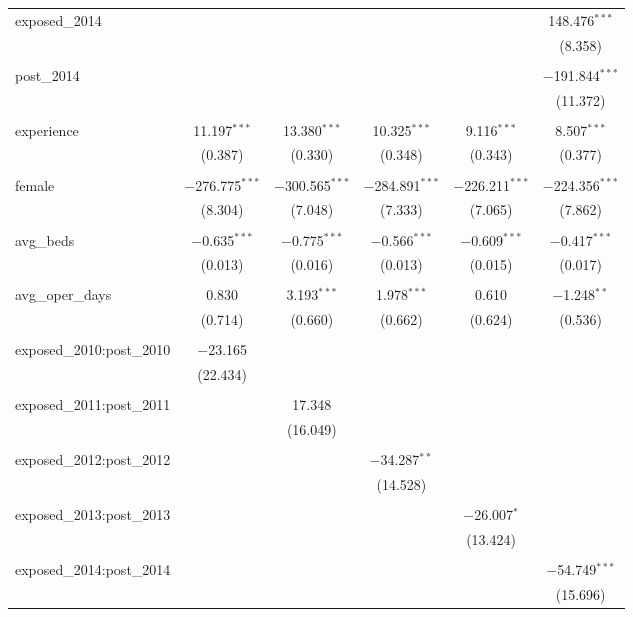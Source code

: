 \begin{table}[!htbp]
\begin{tabular}{@{\extracolsep{5pt}}lccccc}
 exposed\_2014 &  &  &  &  & 148.476$^{***}$ \\ 
  &  &  &  &  & (8.358) \\ 
  & & & & & \\ 
 post\_2014 &  &  &  &  & $-$191.844$^{***}$ \\ 
  &  &  &  &  & (11.372) \\ 
  & & & & & \\ 
 experience & 11.197$^{***}$ & 13.380$^{***}$ & 10.325$^{***}$ & 9.116$^{***}$ & 8.507$^{***}$ \\ 
  & (0.387) & (0.330) & (0.348) & (0.343) & (0.377) \\ 
  & & & & & \\ 
 female & $-$276.775$^{***}$ & $-$300.565$^{***}$ & $-$284.891$^{***}$ & $-$226.211$^{***}$ & $-$224.356$^{***}$ \\ 
  & (8.304) & (7.048) & (7.333) & (7.065) & (7.862) \\ 
  & & & & & \\ 
 avg\_beds & $-$0.635$^{***}$ & $-$0.775$^{***}$ & $-$0.566$^{***}$ & $-$0.609$^{***}$ & $-$0.417$^{***}$ \\ 
  & (0.013) & (0.016) & (0.013) & (0.015) & (0.017) \\ 
  & & & & & \\ 
 avg\_oper\_days & 0.830 & 3.193$^{***}$ & 1.978$^{***}$ & 0.610 & $-$1.248$^{**}$ \\ 
  & (0.714) & (0.660) & (0.662) & (0.624) & (0.536) \\ 
  & & & & & \\ 
 exposed\_2010:post\_2010 & $-$23.165 &  &  &  &  \\ 
  & (22.434) &  &  &  &  \\ 
  & & & & & \\ 
 exposed\_2011:post\_2011 &  & 17.348 &  &  &  \\ 
  &  & (16.049) &  &  &  \\ 
  & & & & & \\ 
 exposed\_2012:post\_2012 &  &  & $-$34.287$^{**}$ &  &  \\ 
  &  &  & (14.528) &  &  \\ 
  & & & & & \\ 
 exposed\_2013:post\_2013 &  &  &  & $-$26.007$^{*}$ &  \\ 
  &  &  &  & (13.424) &  \\ 
  & & & & & \\ 
 exposed\_2014:post\_2014 &  &  &  &  & $-$54.749$^{***}$ \\ 
  &  &  &  &  & (15.696) \\ 

\end{tabular}
\end{table}
